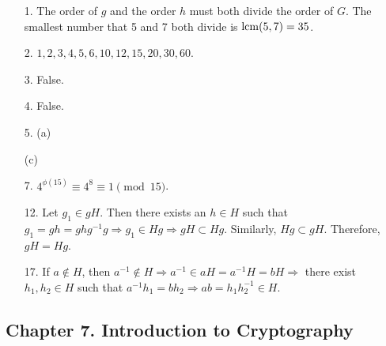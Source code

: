 {\small
\begin{itemize}
 
\item[1.]
The order of $g$ and the order $h$ must both divide the order of $G$.
The smallest number that 5 and 7 both divide is  $\operatorname{lcm}( 5, 7 ) = 35$.
 
\item[2.] 
$1, 2, 3, 4, 5, 6, 10, 12, 15, 20, 30, 60$.
 
\item[3.] 
False.
 
\item[4.]  
False.
 
\item[5.]
(a) 
\raisebox{-18pt}{\parbox{4in}{
\[
\begin{array}{rclccrcl}
    H & = \{ 0, 8, 16 \} && 4 + H & = \{ 4, 12, 20 \} \\
1 + H & = \{ 1, 9, 17 \} && 5 + H & = \{ 5, 13, 21 \} \\
2 + H & = \{ 2, 10, 18\} && 6 + H & = \{ 6, 14, 22 \} \\
3 + H & = \{ 3, 11, 19\} && 7 + H & = \{ 7, 15, 23 \}. 
\end{array}
\]
}}

(c)
 
\item[7.]
$4^{\phi(15)} \equiv 4^8 \equiv 1 \pmod{15}$.
 
\item[12.]
Let $g_1 \in gH$. Then there exists an $h \in H$ such that $g_1 = gh
= ghg^{-1} g \Rightarrow g_1 \in Hg \Rightarrow gH \subset Hg$.
Similarly, $Hg \subset gH$. Therefore, $gH = Hg$.
 
\item[17.]
If $a \notin H$, then $a^{-1} \notin H \Rightarrow a^{-1} \in a H =
a^{-1} H = bH \Rightarrow$ there exist $h_1, h_2 \in H$ such that
$a^{-1} h_1 = b h_2 \Rightarrow ab = h_1 h_2^{-1} \in H$.
 
\end{itemize}
}
 
\subsection*{Chapter 7. Introduction to Cryptography}
 
